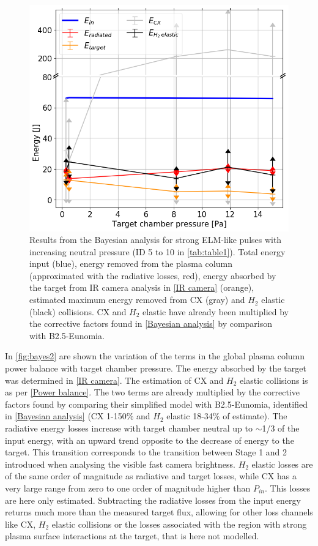 \begin{figure}[!ht]
        \centering
    	\includegraphics[width=0.7\linewidth,trim={0 0 0 5},clip]{Chapters/chapter3/figs/bayesian_strong_3b.png}
	\caption{Results from the Bayesian analysis for strong ELM-like pulses with increasing neutral pressure (ID 5 to 10 in \autoref{tab:table1}). Total energy input (blue), energy removed from the plasma column (approximated with the radiative losses, red), energy absorbed by the target from IR camera analysis in \autoref{IR camera} (orange), estimated maximum energy removed from CX (gray) and $H_2$ elastic (black) collisions. CX and $H_2$ elastic have already been multiplied by the corrective factors found in \autoref{Bayesian analysis} by comparison with B2.5-Eunomia.}
	\label{fig:bayes2}
\end{figure}

In \autoref{fig:bayes2} are shown the variation of the terms in the global plasma column power balance with target chamber pressure. The energy absorbed by the target was determined in \autoref{IR camera}. The estimation of CX and $H_2$ elastic collisions is as per \autoref{Power balance}. The two terms are already multiplied by the corrective factors found by comparing their simplified model with B2.5-Eunomia, identified in \autoref{Bayesian analysis} (CX 1-150\% and $H_2$ elastic 18-34\% of estimate). The radiative energy losses increase with target chamber neutral up to $\sim$1/3 of the input energy, with an upward trend opposite to the decrease of energy to the target. This transition corresponds to the transition between Stage 1 and 2 introduced when analysing the visible fast camera brightness. $H_2$ elastic losses are of the same order of magnitude as radiative and target losses, while CX has a very large range from zero to one order of magnitude higher than $P_{in}$. This losses are here only estimated. Subtracting the radiative losses from the input energy returns much more than the measured target flux, allowing for other loss channels like CX, $H_2$ elastic collisions or the losses associated with the region with strong plasma surface interactions at the target, that is here not modelled.

